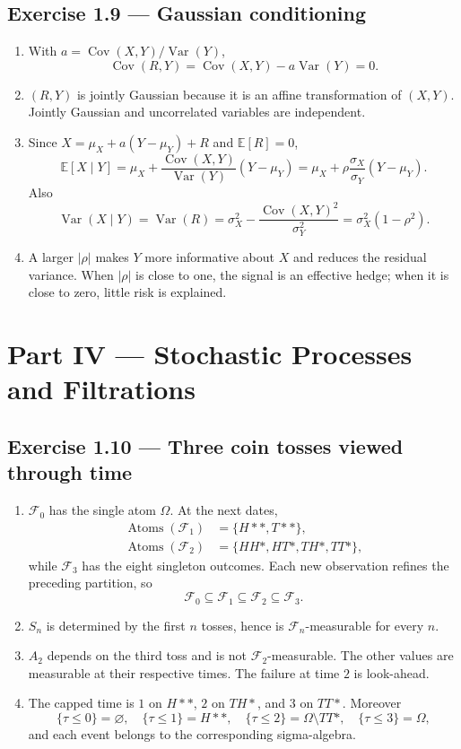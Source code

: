 \documentclass[11pt]{article}
\newcommand{\E}{\mathbb{E}}
\newcommand{\1}{\mathbf{1}}
\begin{document}
\subsection*{Exercise 1.9 --- Gaussian conditioning}
\begin{enumerate}
  \item With $a=\operatorname{Cov}(X,Y)/\operatorname{Var}(Y)$,
  \[
  \operatorname{Cov}(R,Y)
  =\operatorname{Cov}(X,Y)-a\operatorname{Var}(Y)=0.
  \]
  \item $(R,Y)$ is jointly Gaussian because it is an affine transformation of
  $(X,Y)$. Jointly Gaussian and uncorrelated variables are independent.
  \item Since $X=\mu_X+a(Y-\mu_Y)+R$ and $\E[R]=0$,
  \[
  \E[X\mid Y]
  =\mu_X+\frac{\operatorname{Cov}(X,Y)}{\operatorname{Var}(Y)}(Y-\mu_Y)
  =\mu_X+\rho\frac{\sigma_X}{\sigma_Y}(Y-\mu_Y).
  \]
  Also
  \[
  \operatorname{Var}(X\mid Y)=\operatorname{Var}(R)
  =\sigma_X^2-\frac{\operatorname{Cov}(X,Y)^2}{\sigma_Y^2}
  =\sigma_X^2(1-\rho^2).
  \]
  \item A larger $|\rho|$ makes $Y$ more informative about $X$ and reduces
  the residual variance. When $|\rho|$ is close to one, the signal is an
  effective hedge; when it is close to zero, little risk is explained.
\end{enumerate}

\section*{Part IV --- Stochastic Processes and Filtrations}

\subsection*{Exercise 1.10 --- Three coin tosses viewed through time}
\begin{enumerate}
  \item $\mathcal F_0$ has the single atom $\Omega$. At the next dates,
  \[
  \begin{aligned}
  \operatorname{Atoms}(\mathcal F_1)
    &=\{H\!\ast\!\ast,T\!\ast\!\ast\},\\
  \operatorname{Atoms}(\mathcal F_2)
    &=\{HH\!\ast,HT\!\ast,TH\!\ast,TT\!\ast\},
  \end{aligned}
  \]
  while $\mathcal F_3$ has the eight singleton outcomes. Each new observation
  refines the preceding partition, so
  \[
  \mathcal F_0\subseteq\mathcal F_1
  \subseteq\mathcal F_2\subseteq\mathcal F_3.
  \]
  \item $S_n$ is determined by the first $n$ tosses, hence is
  $\mathcal F_n$-measurable for every $n$.
  \item $A_2$ depends on the third toss and is not $\mathcal F_2$-measurable.
  The other values are measurable at their respective times. The failure at
  time $2$ is look-ahead.
  \item The capped time is $1$ on $H**$, $2$ on $TH*$, and $3$ on $TT*$.
  Moreover
  \[
  \{\tau\le0\}=\varnothing,
  \quad
  \{\tau\le1\}=H**,
  \quad
  \{\tau\le2\}=\Omega\setminus TT*,
  \quad
  \{\tau\le3\}=\Omega,
  \]
  and each event belongs to the corresponding sigma-algebra.
\end{enumerate}
\end{document}
